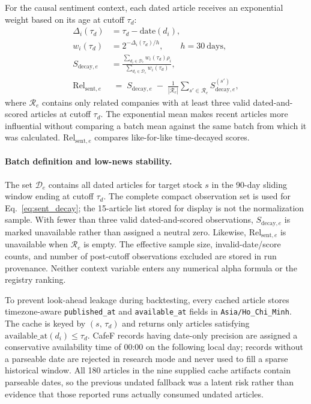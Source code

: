 For the causal sentiment context, each dated article receives an exponential
weight based on its age at cutoff $\tau_d$:
\begin{align}
    \Delta_i(\tau_d) &= \tau_d - \mathrm{date}(d_i), \\
    w_i(\tau_d) &= 2^{-\Delta_i(\tau_d)/h}, \qquad h=30\ \text{days}, \\
    S_{\mathrm{decay},e}
    &= \frac{\sum_{d_i\in\mathcal{D}_e} w_i(\tau_d)\rho_i}
             {\sum_{d_i\in\mathcal{D}_e} w_i(\tau_d)},
    \label{eq:sent_decay} \\[4pt]
    \mathrm{Rel}_{\mathrm{sent},e}
    &\;=\;
    S_{\mathrm{decay},e} \;-\;
    \frac{1}{|\mathcal{R}_e|}
    \sum_{s' \in \mathcal{R}_e} S^{(s')}_{\mathrm{decay},e},
    \label{eq:relsent}
\end{align}
where $\mathcal{R}_e$ contains only related companies with at least three
valid dated-and-scored articles at cutoff $\tau_d$.  The exponential mean makes recent articles
more influential without comparing a batch mean against the same batch from
which it was calculated.  $\mathrm{Rel}_{\mathrm{sent},e}$ compares like-for-like
time-decayed scores.

\paragraph{Batch definition and low-news stability.}
The set $\mathcal{D}_e$ contains all dated articles for target stock $s$ in the 90-day sliding window ending at cutoff $\tau_d$. The complete compact observation set is used for Eq.~\ref{eq:sent_decay}; the 15-article list stored for display is not the normalization sample. With fewer than three valid dated-and-scored observations, $S_{\mathrm{decay},e}$ is marked unavailable rather than assigned a neutral zero. Likewise, $\mathrm{Rel}_{\mathrm{sent},e}$ is unavailable when $\mathcal{R}_e$ is empty. The effective sample size, invalid-date/score counts, and number of post-cutoff observations excluded are stored in run provenance. Neither context variable enters any numerical alpha formula or the registry ranking.

To prevent look-ahead leakage during backtesting, every cached article stores
timezone-aware \texttt{published\_at} and \texttt{available\_at} fields in
\texttt{Asia/Ho\_Chi\_Minh}. The cache is keyed by $(s,\,\tau_d)$ and returns only
articles satisfying $\mathrm{available\_at}(d_i)\leq \tau_d$. CafeF records having
date-only precision are assigned a conservative availability time of 00:00 on
the following local day; records without a parseable date are rejected in
research mode and never used to fill a sparse historical window. All 180
articles in the nine supplied cache artifacts contain parseable dates, so the
previous undated fallback was a latent risk rather than evidence that those
reported runs actually consumed undated articles.

